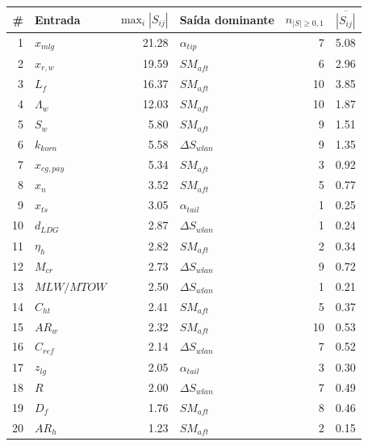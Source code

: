 \begin{tabular}{rlrlrr}
\toprule
\# & Entrada & $\max_i|S_{ij}|$ & Sa\'ida dominante & $n_{|S|\geq 0{,}1}$ & $\overline{|S_{ij}|}$ \\
\midrule
1 & $x_{mlg}$ & 21.28 & $\alpha_{tip}$ & 7 & 5.08 \\
2 & $x_{r,w}$ & 19.59 & $SM_{aft}$ & 6 & 2.96 \\
3 & $L_f$ & 16.37 & $SM_{aft}$ & 10 & 3.85 \\
4 & $\Lambda_w$ & 12.03 & $SM_{aft}$ & 10 & 1.87 \\
5 & $S_w$ & 5.80 & $SM_{aft}$ & 9 & 1.51 \\
6 & $k_{korn}$ & 5.58 & $\Delta S_{wlan}$ & 9 & 1.35 \\
7 & $x_{cg,pay}$ & 5.34 & $SM_{aft}$ & 3 & 0.92 \\
8 & $x_n$ & 3.52 & $SM_{aft}$ & 5 & 0.77 \\
9 & $x_{ts}$ & 3.05 & $\alpha_{tail}$ & 1 & 0.25 \\
10 & $d_{LDG}$ & 2.87 & $\Delta S_{wlan}$ & 1 & 0.24 \\
11 & $\eta_h$ & 2.82 & $SM_{aft}$ & 2 & 0.34 \\
12 & $M_{cr}$ & 2.73 & $\Delta S_{wlan}$ & 9 & 0.72 \\
13 & $MLW/MTOW$ & 2.50 & $\Delta S_{wlan}$ & 1 & 0.21 \\
14 & $C_{ht}$ & 2.41 & $SM_{aft}$ & 5 & 0.37 \\
15 & $AR_w$ & 2.32 & $SM_{aft}$ & 10 & 0.53 \\
16 & $C_{ref}$ & 2.14 & $\Delta S_{wlan}$ & 7 & 0.52 \\
17 & $z_{lg}$ & 2.05 & $\alpha_{tail}$ & 3 & 0.30 \\
18 & $R$ & 2.00 & $\Delta S_{wlan}$ & 7 & 0.49 \\
19 & $D_f$ & 1.76 & $SM_{aft}$ & 8 & 0.46 \\
20 & $AR_h$ & 1.23 & $SM_{aft}$ & 2 & 0.15 \\
\bottomrule
\end{tabular}